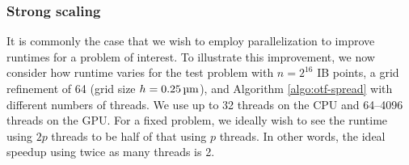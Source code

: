 \subsubsection{Strong scaling}
It is commonly the case that we wish to employ parallelization to improve 
runtimes for a problem of interest. To illustrate this improvement, we now
consider how runtime varies for the test problem with $n=2^{16}$ IB points, a
grid refinement of 64 (grid size $h=0.25\um$), and Algorithm
\ref{algo:otf-spread} with different numbers of threads. We use up to 32
threads on the CPU and 64--4096 threads on the GPU. For a fixed problem, we
ideally wish to see the runtime using $2p$ threads to be half of that using
$p$ threads. In other words, the ideal speedup using twice as many threads is
2.


